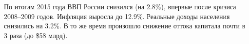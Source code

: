\documentclass{article}
\begin{document}

По итогам 2015 года ВВП России снизился (на 2.8\%),
впервые после кризиса 2008--2009 годов. Инфляция
выросла до 12.9\%. Реальные доходы населения
снизились на 3.2\%. В то же время произошло
снижение оттока капитала почти в 3 раза (до \$58
млрд).
\end{document}
